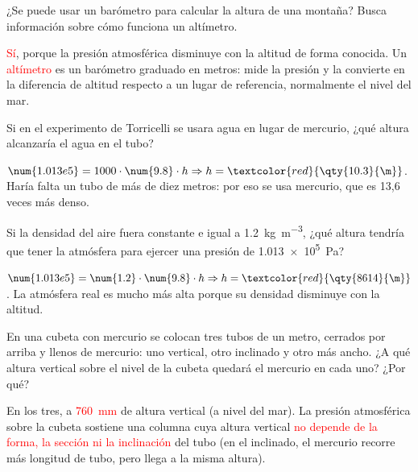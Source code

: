 \begin{exercise}
    ¿Se puede usar un barómetro para calcular la altura de una montaña? Busca información sobre cómo funciona un altímetro.
    \begin{solu}
        \textcolor{red}{Sí}, porque la presión atmosférica disminuye con la altitud de forma conocida. Un \textcolor{red}{altímetro} es un barómetro graduado en metros: mide la presión y la convierte en la diferencia de altitud respecto a un lugar de referencia, normalmente el nivel del mar.
    \end{solu}
\end{exercise}

\begin{exercise}
    Si en el experimento de Torricelli se usara agua en lugar de mercurio, ¿qué altura alcanzaría el agua en el tubo?
    \begin{solu}
        \(\num{1.013e5} = 1000 \cdot \num{9.8} \cdot h \Rightarrow h = \textcolor{red}{\qty{10.3}{\m}}\). Haría falta un tubo de más de diez metros: por eso se usa mercurio, que es 13,6 veces más denso.
    \end{solu}
\end{exercise}

\begin{exercise}
    Si la densidad del aire fuera constante e igual a \qty{1.2}{\kg\per\cubic\m}, ¿qué altura tendría que tener la atmósfera para ejercer una presión de \qty{1.013e5}{\pascal}?
    \begin{solu}
        \(\num{1.013e5} = \num{1.2} \cdot \num{9.8} \cdot h \Rightarrow h = \textcolor{red}{\qty{8614}{\m}}\). La atmósfera real es mucho más alta porque su densidad disminuye con la altitud.
    \end{solu}
\end{exercise}

\begin{exercise}
    En una cubeta con mercurio se colocan tres tubos de un metro, cerrados por arriba y llenos de mercurio: uno vertical, otro inclinado y otro más ancho. ¿A qué altura vertical sobre el nivel de la cubeta quedará el mercurio en cada uno? ¿Por qué?
    \begin{solu}
        En los tres, a \textcolor{red}{\qty{760}{\mm}} de altura vertical (a nivel del mar). La presión atmosférica sobre la cubeta sostiene una columna cuya altura vertical \textcolor{red}{no depende de la forma, la sección ni la inclinación} del tubo (en el inclinado, el mercurio recorre más longitud de tubo, pero llega a la misma altura).
    \end{solu}
\end{exercise}

